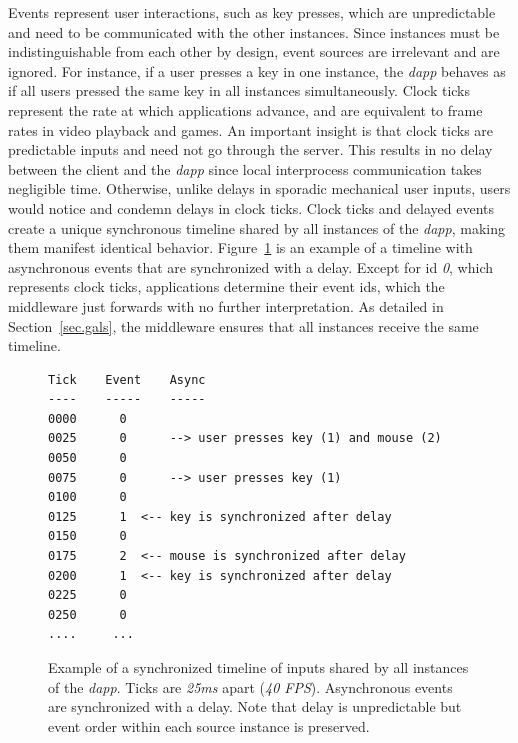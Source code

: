 \documentclass[sigplan,screen]{acmart}
\newcommand{\dapp}{\emph{dapp}\xspace}
\begin{document}
Events represent user interactions, such as key presses, which are
unpredictable and need to be communicated with the other instances.
Since instances must be indistinguishable from each other by design, event
sources are irrelevant and are ignored.
For instance, if a user presses a key in one instance, the \dapp behaves as if
all users pressed the same key in all instances simultaneously.
%
Clock ticks represent the rate at which applications advance, and are
equivalent to frame rates in video playback and games.
An important insight is that clock ticks are predictable inputs and need not go
through the server.
This results in no delay between the client and the \dapp since local
interprocess communication takes negligible time.
Otherwise, unlike delays in sporadic mechanical user inputs, users would notice
and condemn delays in clock ticks.
%
Clock ticks and delayed events create a unique synchronous timeline shared by
all instances of the \dapp, making them manifest identical behavior.
Figure~\ref{fig.timeline} is an example of a timeline with asynchronous events
that are synchronized with a delay.
Except for id \emph{0}, which represents clock ticks, applications determine
their event ids, which the middleware just forwards with no further
interpretation.
As detailed in Section~\ref{sec.gals}, the middleware ensures that all
instances receive the same timeline.

\begin{figure}[t]
{\scriptsize
\begin{verbatim}
Tick    Event    Async
----    -----    -----
0000      0
0025      0      --> user presses key (1) and mouse (2)
0050      0
0075      0      --> user presses key (1)
0100      0
0125      1  <-- key is synchronized after delay
0150      0
0175      2  <-- mouse is synchronized after delay
0200      1  <-- key is synchronized after delay
0225      0
0250      0
....     ...
\end{verbatim}
}
  \caption{
    \label{fig.timeline}
    Example of a synchronized timeline of inputs shared by all instances of the
    \dapp.
    Ticks are \emph{25ms} apart (\emph{40 FPS}).
    Asynchronous events are synchronized with a delay.
    Note that delay is unpredictable but event order within each source
    instance is preserved.
  }
\end{figure}
\end{document}
